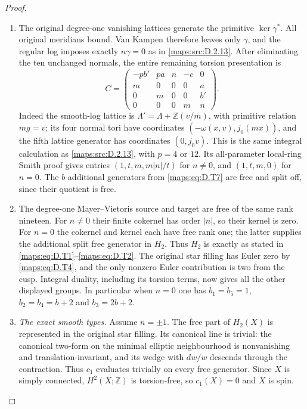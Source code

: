 \begin{proof}
\begin{enumerate}[label=\arabic*.,leftmargin=*]
\item The original degree-one vanishing lattices generate the
primitive $\ker\gamma^*$. All original meridians bound.
Van Kampen therefore leaves only $\gamma$, and the regular
log imposes exactly $n\gamma=0$ as in \ref{maps:src:D.2.13}.
After eliminating the ten unchanged normals, the entire
remaining torsion presentation is
\[
 C=\begin{pmatrix}
 -pb'&pa&n&-c&0\\
 m&0&0&0&a\\
 0&m&0&0&b'\\
 0&0&0&m&n
 \end{pmatrix}.
 \tag{D.T10}\label{maps:eq:D.T10}
\]
Indeed the smooth-log lattice is
$\Lambda'=\Lambda+\mathbb Z(v/m)$, with primitive relation
$mg=v$; its four normal tori have coordinates
$(-\omega(x,v),j_0(mx))$, and the fifth lattice generator
has coordinates $(0,j_0v)$. This is the same integral
calculation as \ref{maps:src:D.2.13}, with $p=4$ or $12$.
Its all-parameter local-ring Smith proof gives entries
$(1,t,m,m|n|/t)$ for $n\ne0$, and $(1,t,m,0)$ for $n=0$.
The $b$ additional generators from \eqref{maps:eq:D.T7} are free and
split off, since their quotient is free.

\item The degree-one Mayer--Vietoris source and target are free
of the same rank nineteen. For $n\ne0$ their finite cokernel
has order $|n|$, so their kernel is zero. For $n=0$ the
cokernel and kernel each have free rank one; the latter
supplies the additional split free generator in $H_2$.
Thus $H_2$ is exactly as stated in \eqref{maps:eq:D.T1}--\eqref{maps:eq:D.T2}.
The original star filling has Euler zero by \eqref{maps:eq:D.T4}, and
the only nonzero Euler contribution is two from the cusp.
Integral duality, including its torsion terms, now gives
all the other displayed groups. In particular when $n=0$
one has $b_1=b_5=1$, $b_2=b_4=b+2$ and $b_3=2b+2$.

\item \emph{The exact smooth types.}
Assume $n=\pm1$. The free part of $H_2(X)$ is represented
in the original star filling. Its canonical line is trivial:
the canonical two-form on the minimal elliptic neighbourhood
is nonvanishing and translation-invariant, and its wedge
with $dw/w$ descends through the contraction. Thus $c_1$
evaluates trivially on every free generator. Since $X$ is
simply connected, $H^2(X;\mathbb Z)$ is torsion-free, so
$c_1(X)=0$ and $X$ is spin.


\end{enumerate}
\end{proof}
